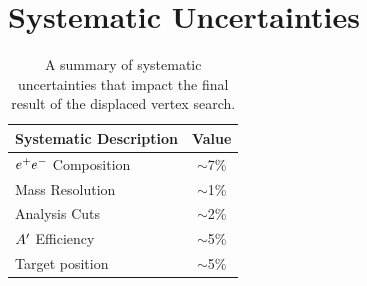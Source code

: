 



\section{Systematic Uncertainties} \label{sec:systematics}


\begin{table}[!hb] 
    \centering
    \begin{tabular}{lc}
        \toprule
        \textbf{Systematic Description} & \textbf{Value} \\
        \midrule
        \midrule
            $e^{+}e^{-}$ Composition & $\sim$7\% \\
            Mass Resolution & $\sim$1\% \\
            Analysis Cuts & $\sim$2\% \\
            $A^\prime$ Efficiency & $\sim$5\% \\
            Target position & $\sim$5\% \\
        \midrule
        \midrule
        \bottomrule
    \end{tabular}
    \caption{A summary of systematic uncertainties that impact the final result of the displaced vertex search.}
    \label{tab:systematics}
\end{table}

